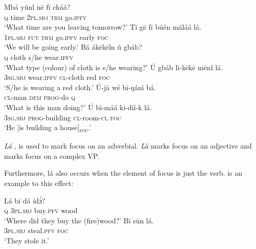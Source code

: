\documentclass[output=paper,colorlinks,citecolor=brown]{langscibook}
\begin{document}
\ea%
    \label{ex:bisilki:26}
    \ea\label{ex:bisilki:26a}
        \ea\label{ex:bisilki:26ai}
        \gll    Mbá	yúnl	nē		fī	cháá?\\
                \textsc{q}	time	\textsc{2pl.sbj}	\textsc{trm}	go\textsc{.ipfv}\\
        \glt    ‘What time are you leaving tomorrow?’
        \ex\label{ex:bisilki:26aii}
        \gll    Tī		gē	fī	búén	máláá		lá.\\
                \textsc{1pl.sbj}	\textsc{fut}	\textsc{trm}	go\textsc{.ipfv}  early	\textsc{foc}\\
        \glt    ‘We will be going early.’
        \z
    \ex\label{ex:bisilki:26b}
        \ea\label{ex:bisilki:26bi}
        \gll    Bá	ákēkēln	ú	gbáb?\\
                \textsc{q}	cloth		s/he	wear\textsc{.ipfv}\\
        \glt    ‘What type (colour) of cloth is s/he wearing?’
        \ex\label{ex:bisilki:26bii}
        \gll    Ú	gbáb	lī-kēkē	mēnl		lá.\\
                \textsc{3sg.sbj}	wear\textsc{.ipfv}	\textsc{cl-}cloth	red	\textsc{foc}\\
        \glt    ‘S/he is wearing a red cloth.’
        \z
    \ex\label{ex:bisilki:26c}
        \ea\label{ex:bisilki:26ci}
        \gll    Ú-jà		wé	bī-ŋánì	bá.\\
                \textsc{cl-}man	\textsc{dem}	\textsc{prog-}do	\textsc{q}\\
        \glt    ‘What is this man doing?’
        \ex\label{ex:bisilki:26cii}
        \gll    Ú		bī-máá		kī-díí-k		lá.\\
                \textsc{3sg.sbj}	\textsc{prog-}building	\textsc{cl-}room\textsc{-cl}		\textsc{foc}\\
        \glt    ‘He [is building a house]\textsubscript{\textsc{foc}}.’
        \z
    
    \z
\z

\textit{Lá} , is used to mark focus on an adverbial. \textit{La}́ marks focus on an adjective and  marks focus on a complex VP.

Furthermore, lá also occurs when the element of focus is just the verb.  is an example to this effect:

\ea%
    \label{ex:bisilki:27}
    \ea\label{ex:bisilki:27a}
    \gll    Lá	bī		dá		ídɔ́?\\
            \textsc{q}	\textsc{3pl.sbj}	buy\textsc{.pfv}	wood\\
    \glt    ‘Where did they buy the (fire)wood?’
    \ex\label{ex:bisilki:27b}
    \gll    Bī		sūn		lá.\\
            \textsc{3pl.sbj}	steal\textsc{.pfv}	\textsc{foc}\\
    \glt    ‘They stole it.’
    \z
\z
\end{document}
